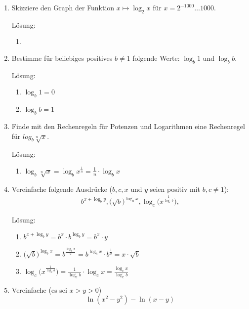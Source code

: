 \documentclass[../main.tex]{subfiles}
\begin{document}
\begin{enumerate}
	\item Skizziere den Graph der Funktion \( x \mapsto \log_2 x \) für \( x = 2^{-1000} \dots 1000 \).

	      Lösung:
	      \begin{enumerate}
		      \item
	      \end{enumerate}
	\item Bestimme für beliebiges positives \( b \neq 1 \) folgende Werte:
	      \( \log_b 1 \) und \( \log_b b \).

	      Lösung:
	      \begin{enumerate}
		      \item \( \log_b 1 = 0 \)
		      \item \( \log_b b = 1 \)
	      \end{enumerate}
	\item Finde mit den Rechenregeln für Potenzen und Logarithmen eine Rechenregel für \(
	      log_b \sqrt[n]{x}
	      \).

	      Lösung:
	      \begin{enumerate}
		      \item \( \log_b \sqrt[n]{x} = \log_b x^{\frac{1}{n}} = \frac{1}{n} \cdot \log_b x\)
	      \end{enumerate}
	\item Vereinfache folgende Ausdrücke (\( b, c, x \) und \( y \)
	      seien positiv mit \( b,c \neq 1 \)):
	      \begin{align*}
		      b^{x + \log_b y},
		      \Big( \sqrt{b} \Big)^{\log_b x},
		      \log_c \Big( x^{ \frac{1}{\log_c b}} \Big),
	      \end{align*}

	      Lösung:
	      \begin{enumerate}
		      \item \(  b^{x + \log_b y}
		            = b^x \cdot b^{\log_b y}
		            = b^x \cdot y \)
		      \item \( \Big( \sqrt{b} \Big)^{\log_b x}
		            = b^{\frac{ \log_b x }{ 2 }}
		            = b^{\log_b x} \cdot b^{\frac{1}{2}}
		            = x \cdot \sqrt{b} \)
		      \item \( \log_c \Big( x^{ \frac{1}{\log_c b}} \Big)
		            = \frac{1}{\log_c b} \cdot \log_c x
		            = \frac{ \log_c x}{ \log_c b} \)
	      \end{enumerate}
	\item Vereinfache (es sei \( x > y > 0 \))
	      \[  \ln(x^2 - y^2) - \ln(x - y)\]


\end{enumerate}
\end{document}
